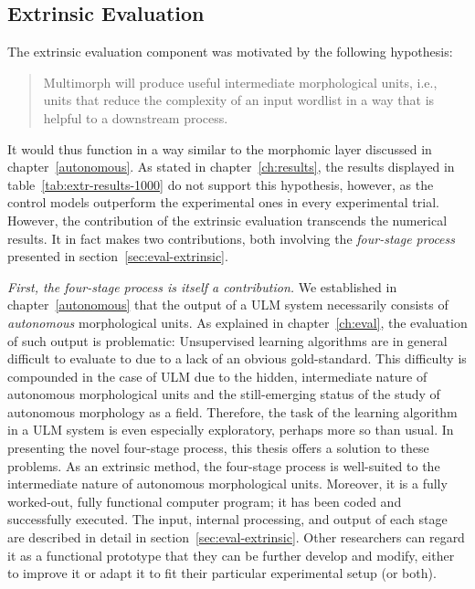 \subsection{Extrinsic Evaluation}
The extrinsic evaluation component was motivated by the following hypothesis:
\begin{quotation}\noindent
Multimorph will produce useful intermediate morphological units, i.e., units that reduce the
complexity of an input wordlist in a way that is helpful to a downstream process.
\end{quotation}
 It would thus function in a way similar to the morphomic layer discussed in chapter~\ref{autonomous}. As stated in chapter~\ref{ch:results}, the results displayed in table~\ref{tab:extr-results-1000} do not support this hypothesis, however, as the control models outperform the experimental ones in every experimental trial. 
However, the contribution of the extrinsic evaluation transcends the numerical results.
It in fact makes two contributions, both involving the \emph{four-stage process} presented in section~\ref{sec:eval-extrinsic}.

\emph{First, the four-stage process is itself a contribution.}
We established in chapter~\ref{autonomous} that the output of a ULM system necessarily consists of \emph{autonomous} morphological units.
As explained in chapter~\ref{ch:eval}, the evaluation of such output is problematic: Unsupervised learning algorithms are in general difficult to evaluate to due to a lack of an obvious gold-standard. This difficulty is compounded in the case of ULM due to the hidden, intermediate nature of autonomous morphological units and the still-emerging status of the study of autonomous morphology as a field.  Therefore, the task of the learning algorithm in a ULM system is even especially exploratory, perhaps more so than usual. %
In presenting the novel four-stage process, this thesis offers a solution to these problems. As an extrinsic method, the four-stage process is well-suited to the intermediate nature of autonomous morphological units. 
Moreover, it is a fully worked-out, fully functional computer program; it has been coded and successfully executed. The input, internal processing, and output of each stage are described in detail in section~\ref{sec:eval-extrinsic}. Other researchers can regard it as a functional prototype that they can be further develop and modify, either to improve it or adapt it to fit their particular experimental setup (or both).

